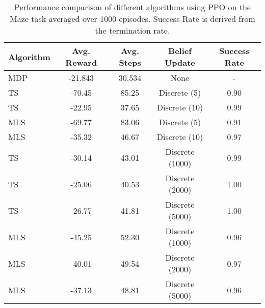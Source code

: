 \begin{table}[H]
    \centering
    \begin{tabular}{lcccc}
    \toprule
    \textbf{Algorithm} & \textbf{Avg. Reward} & \textbf{Avg. Steps} & \textbf{Belief Update} & \textbf{Success Rate}\\
    \midrule
    MDP & -21.843 & 30.534 & None & - \\
    \midrule
        TS & -70.45 & 85.25 & Discrete (5) & 0.90 \\
    TS & -22.95 & 37.65 & Discrete (10) & 0.99 \\
    MLS & -69.77 & 83.06 & Discrete (5) & 0.91 \\
    MLS & -35.32 & 46.67 & Discrete (10) & 0.97 \\
    TS & -30.14 & 43.01 & Discrete (1000) & 0.99 \\
    TS & -25.06 & 40.53 & Discrete (2000) & 1.00 \\
    TS & -26.77 & 41.81 & Discrete (5000) & 1.00 \\
    MLS & -45.25 & 52.30 & Discrete (1000) & 0.96 \\
    MLS & -40.01 & 49.54 & Discrete (2000) & 0.97 \\
    MLS & -37.13 & 48.81 & Discrete (5000) & 0.96 \\
    \midrule
    \bottomrule
    \end{tabular}
    \caption{Performance comparison of different algorithms using PPO on the Maze task averaged over 1000 episodes. Success Rate is derived from the termination rate.}
    \label{tab:maze_results_ppo}
\end{table}